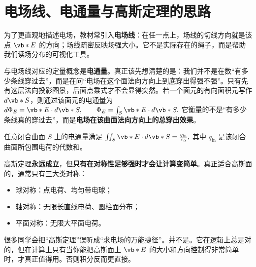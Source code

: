 \documentclass[lang=cn,11pt]{elegantbook}
\begin{document}
\section{电场线、电通量与高斯定理的思路}

为了更直观地描述电场，教材常引入\textbf{电场线}：在任一点上，场线的切线方向就是该点 \(\vb*{E}\) 的方向；场线疏密反映场强大小。它不是实际存在的绳子，而是帮助我们读场分布的可视化工具。

与电场线对应的定量概念是\textbf{电通量}。真正该先想清楚的是：我们并不是在数“有多少条线穿过去”，而是在问“电场在这个面法向方向上到底穿出得强不强”。只有先有这层法向投影图景，后面点乘式才不会显得突然。若一个面元的有向面积元写作 \(d\vb*{S}\)，则通过该面元的电通量为
 \(d\Phi_E=\vb*{E}\cdot d\vb*{S}, \qquad \Phi_E=\int_S \vb*{E}\cdot d\vb*{S}.\) 
它衡量的不是“有多少条线真的穿过去”，而是\textbf{电场在该曲面法向方向上的总穿出效果}。

\begin{theorem}[高斯定理]
任意闭合曲面 \(S\) 上的电通量满足
 \(\iint_S \vb*{E}\cdot d\vb*{S} =\frac{q_{\mathrm{in}}}{\varepsilon_0},\) 
其中 \(q_{\mathrm{in}}\) 是该闭合曲面所包围电荷的代数和。
\end{theorem}

\begin{center}
\end{center}

高斯定理\textbf{永远成立}，但\textbf{只有在对称性足够强时才会让计算变简单}。真正适合高斯面的，通常只有三大类对称：
\begin{itemize}
 \item 球对称：点电荷、均匀带电球；
 \item 轴对称：无限长直线电荷、圆柱面分布；
 \item 平面对称：无限大平面电荷。
\end{itemize}

\begin{remark}
很多同学会把“高斯定理”误听成“求电场的万能捷径”。并不是。它在逻辑上总是对的，但在计算上只有当你能把高斯面上 \(\vb*{E}\) 的大小和方向控制得非常简单时，才真正值得用。否则积分反而更直接。
\end{remark}
\end{document}
